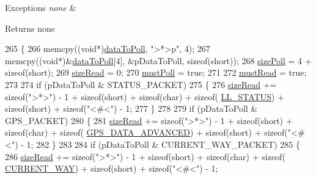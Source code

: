 \begin{DoxyExceptions}{Exceptions}
{\em none} & \\
\hline
\end{DoxyExceptions}
\begin{DoxyReturn}{Returns}
none 
\end{DoxyReturn}

\begin{DoxyCode}
265 \{
266     memcpy((\textcolor{keywordtype}{void}*)\hyperlink{a00002_a581ac8ca710cda078fd8ddb8e50954eb}{dataToPoll}, \textcolor{stringliteral}{">*>p"}, 4);
267     memcpy((\textcolor{keywordtype}{void}*)&\hyperlink{a00002_a581ac8ca710cda078fd8ddb8e50954eb}{dataToPoll}[4], &pDataToPoll, \textcolor{keyword}{sizeof}(\textcolor{keywordtype}{short}));
268     \hyperlink{a00002_a608be86b18e15c3309a1b50794a2115c}{sizePoll} = 4 + \textcolor{keyword}{sizeof}(short);
269     \hyperlink{a00002_ad9f5381795006f1f187538296368cd11}{sizeRead} = 0;
270     \hyperlink{a00002_a21713484042dd9404528d9cec57ebe87}{mustPoll} = \textcolor{keyword}{true};
271 
272     \hyperlink{a00002_a129a62f35fc57084ceccbdc82794d9c1}{mustRead} = \textcolor{keyword}{true};
273 
274     \textcolor{keywordflow}{if} (pDataToPoll & STATUS\_PACKET)
275     \{
276         \hyperlink{a00002_ad9f5381795006f1f187538296368cd11}{sizeRead} += \textcolor{keyword}{sizeof}(\textcolor{stringliteral}{">*>"}) - 1 +  \textcolor{keyword}{sizeof}(\textcolor{keywordtype}{short}) + \textcolor{keyword}{sizeof}(char) + \textcolor{keyword}{sizeof}(
      \hyperlink{a00004_df/d98/a00107}{LL\_STATUS}) + \textcolor{keyword}{sizeof}(short) + \textcolor{keyword}{sizeof}(\textcolor{stringliteral}{"<#<"}) - 1;
277     \}
278 
279     \textcolor{keywordflow}{if} (pDataToPoll & GPS\_PACKET)
280     \{
281         \hyperlink{a00002_ad9f5381795006f1f187538296368cd11}{sizeRead} += \textcolor{keyword}{sizeof}(\textcolor{stringliteral}{">*>"}) - 1 +  \textcolor{keyword}{sizeof}(\textcolor{keywordtype}{short}) + \textcolor{keyword}{sizeof}(char) + \textcolor{keyword}{sizeof}(
      \hyperlink{a00004_d3/d32/a00105}{GPS\_DATA\_ADVANCED}) + \textcolor{keyword}{sizeof}(short) + \textcolor{keyword}{sizeof}(\textcolor{stringliteral}{"<#<"}) - 1;
282     \}
283 
284     \textcolor{keywordflow}{if} (pDataToPoll & CURRENT\_WAY\_PACKET)
285     \{
286         \hyperlink{a00002_ad9f5381795006f1f187538296368cd11}{sizeRead} += \textcolor{keyword}{sizeof}(\textcolor{stringliteral}{">*>"}) - 1 +  \textcolor{keyword}{sizeof}(\textcolor{keywordtype}{short}) + \textcolor{keyword}{sizeof}(char) + \textcolor{keyword}{sizeof}(
      \hyperlink{a00004_d1/d84/a00052}{CURRENT\_WAY}) + \textcolor{keyword}{sizeof}(short) + \textcolor{keyword}{sizeof}(\textcolor{stringliteral}{"<#<"}) - 1;

\end{DoxyCode}
